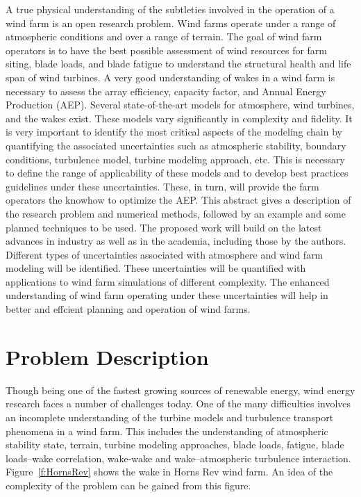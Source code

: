 \documentclass[]{aiaa-tc}%
\begin{document}
A true physical understanding of the subtleties involved in the operation of a wind farm is an open research problem. Wind farms operate under a range of atmospheric conditions and over a range of terrain. The goal of wind farm operators is to have the best possible assessment of wind resources for farm siting, blade loads, and blade fatigue to understand the structural health and life span of wind turbines. A very good understanding of wakes in a wind farm is necessary to assess the array efficiency, capacity factor, and Annual Energy Production (AEP). Several state-of-the-art models for atmosphere, wind turbines, and the wakes exist. These models vary significantly in complexity and fidelity. It is very important to identify the most critical aspects of the modeling chain by quantifying the associated uncertainties such as atmospheric stability, boundary conditions, turbulence model, turbine modeling approach, etc. This is necessary to define the range of applicability of these models and to develop best practices guidelines under these uncertainties. These, in turn, will provide the farm operators the knowhow to optimize the AEP. This abstract gives a description of the research problem and numerical methods, followed by an example and some planned techniques to be used. The proposed work will build on the latest advances in industry as well as in the academia, including those by the authors. Different types of uncertainties associated with atmosphere and wind farm modeling will be identified. These uncertainties will be quantified with applications to wind farm simulations of different complexity. The enhanced understanding of wind farm operating under these uncertainties will help in better and effcient planning and operation of wind farms.

\section{Problem Description}
Though being one of the fastest growing sources of renewable energy, wind energy research faces a number of challenges today. One of the many difficulties involves an incomplete understanding of the turbine models and turbulence transport phenomena in a wind farm. This includes the understanding of atmospheric stability state, terrain, turbine modeling approaches, blade loads, fatigue, blade loads–wake correlation, wake-wake and wake–atmospheric turbulence interaction.  Figure~\ref{f:HornsRev} shows the wake in Horns Rev wind farm. An idea of the complexity of the problem can be gained from this figure.
\end{document}
